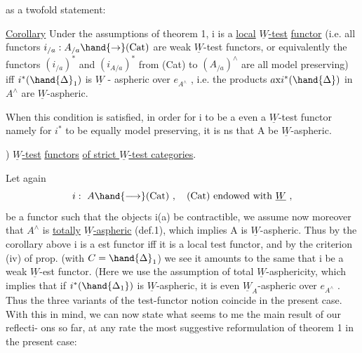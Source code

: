
as a twofold statement:

\uline{Corollary} Under the assumptions of theorem 1, i is a \uline{local} \uline{$\underline{W}$-test}
\uline{functor} (i.e. all functors $i_{/a} : A_{/a}\hand{\to}(\mathrm{Cat})$ are weak $\underline{W}$-test functors,
or equivalently the functors $(i_{/a})^*$ and $(i_{A/a})^*$ from (Cat) to $(A_{/a})^\wedge$
are all model preserving) iff $i^*(\hand{\Delta}_1)$ is $\underline{W}$ - aspheric over $e_{A^\wedge}$ , i.e.
the products $a\mathrm{x}i^*(\hand{\Delta})$ in $A^\wedge$  are $\underline{W}$-aspheric. \par\noindent {}\par\noindent  When this condition is
satisfied, in order for i to be a even a $\underline{W}$-test functor namely for $i^*$ 
to be equally model preserving, it is ns that A be $\underline{W}$-aspheric.

 ) \uline{} \uline{$\underline{W}$-test} \uline{functors}  \uline{of strict $\underline{W}$-test categories}.

Let  again
\[ i:\ A\hand{\longrightarrow}(\mathrm{Cat}) \ ,\quad (\mathrm{Cat}) \text{ endowed with } \underline{W} \ , \]
be a functor such that the objects i(a) be contractible, we assume now
moreover that $A^\wedge$ is \uline{totally} \uline{$\underline{W}$-aspheric} (def.1), which implies A is
$\underline{W}$-aspheric. Thus by the corollary above i is a est functor iff it is
a local test functor, and by the criterion (iv) of prop. (with $C=\hand{\Delta}_1$)
we see it amounts to the same that i be a weak $\underline{W}$-est functor. (Here we
use the assumption of total $\underline{W}$-asphericity, which implies that if $i^*(\hand{\Delta_1})$
is $\underline{W}$-aspheric, it is even $\underline{W}_A$-aspheric over $e_{A^\wedge}$ .\hand{)} Thus the three variants
of the test-functor notion coincide in the present case. With this in
mind, we can now state what seems to me the main result of our reflecti-%
ons so far, at any rate the most suggestive reformulation of theorem 1
in the present case:

